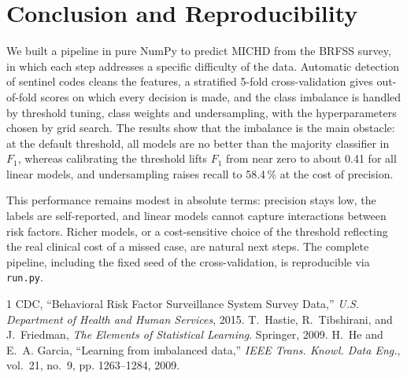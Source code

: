 \documentclass[10pt,conference,compsocconf]{IEEEtran}
\begin{document}
\section{Conclusion and Reproducibility}
We built a pipeline in pure NumPy to predict MICHD from the BRFSS survey, in which each step addresses a specific difficulty of the data. Automatic detection of sentinel codes cleans the features, a stratified 5-fold cross-validation gives out-of-fold scores on which every decision is made, and the class imbalance is handled by threshold tuning, class weights and undersampling, with the hyperparameters chosen by grid search. The results show that the imbalance is the main obstacle: at the default threshold, all models are no better than the majority classifier in $F_1$, whereas calibrating the threshold lifts $F_1$ from near zero to about 0.41 for all linear models, and undersampling raises recall to 58.4\,\% at the cost of precision.
 
This performance remains modest in absolute terms: precision stays low, the labels are self-reported, and linear models cannot capture interactions between risk factors. Richer models, or a cost-sensitive choice of the threshold reflecting the real clinical cost of a missed case, are natural next steps. The complete pipeline, including the fixed seed of the cross-validation, is reproducible via \texttt{run.py}.
 
\begin{thebibliography}{1}
CDC, ``Behavioral Risk Factor Surveillance System Survey Data,'' \emph{U.S. Department of Health and Human Services}, 2015.
T.~Hastie, R.~Tibshirani, and J.~Friedman, \emph{The Elements of Statistical Learning}. Springer, 2009.
H.~He and E.~A. Garcia, ``Learning from imbalanced data,'' \emph{IEEE Trans. Knowl. Data Eng.}, vol.~21, no.~9, pp. 1263--1284, 2009.
\end{thebibliography}
 
\end{document}
